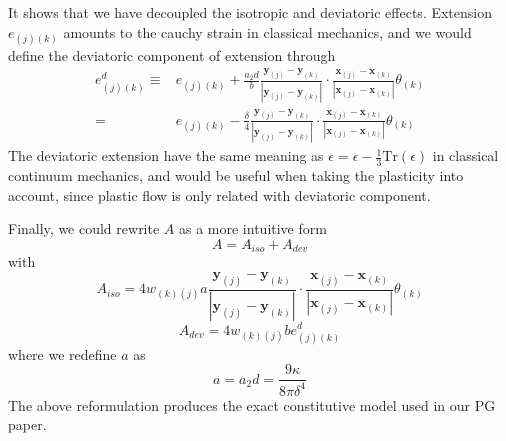 \documentclass[a4paper,11pt,CJK]{paper}
\newcommand{\bfxj}{\textbf{x}_{(j)}}
\newcommand{\bfyj}{\textbf{y}_{(j)}}
\newcommand{\bfxk}{\textbf{x}_{(k)}}
\newcommand{\bfyk}{\textbf{y}_{(k)}}
\newcommand{\wkj}{w_{(k)(j)}}
\newcommand{\thetak}{\theta_{(k)}}
\begin{document}
It shows that we have decoupled the isotropic and deviatoric effects.
Extension $e_{(j)(k)}$ amounts to the cauchy strain in classical mechanics, and we would define the deviatoric component of extension through
\begin{equation}
\begin{aligned}
e^d_{(j)(k)} \equiv& e_{(j)(k)} + \frac{a_2d}{b}\frac{\bfyj-\bfyk}{|\bfyj-\bfyk|}\cdot\frac{\bfxj-\bfxk}{|\bfxj-\bfxk|}\thetak\\
                  =& e_{(j)(k)} - \frac{\delta}{4}\frac{\bfyj-\bfyk}{|\bfyj-\bfyk|}\cdot\frac{\bfxj-\bfxk}{|\bfxj-\bfxk|}\thetak
\end{aligned} 
\end{equation}
The deviatoric extension have the same meaning as $\epsilon = \epsilon - \frac{1}{3}\mathrm{Tr}(\epsilon)$ in classical continuum mechanics,
and would be useful when taking the plasticity into account, since plastic flow is only related with deviatoric component.

Finally, we could rewrite $A$ as a more intuitive form
\begin{equation}
A = A_{iso} + A_{dev}
\end{equation}
with
\begin{equation}
A_{iso} = 4\wkj a\frac{\bfyj-\bfyk}{|\bfyj-\bfyk|}\cdot\frac{\bfxj-\bfxk}{|\bfxj-\bfxk|}\thetak
\end{equation}
\begin{equation}
A_{dev} = 4\wkj b e^d_{(j)(k)}
\end{equation}
where we redefine $a$ as
\begin{equation}
a = a_2d = \frac{9\kappa}{8\pi\delta^4}
\end{equation}
The above reformulation produces the exact constitutive model used in our PG paper.
\end{document}
